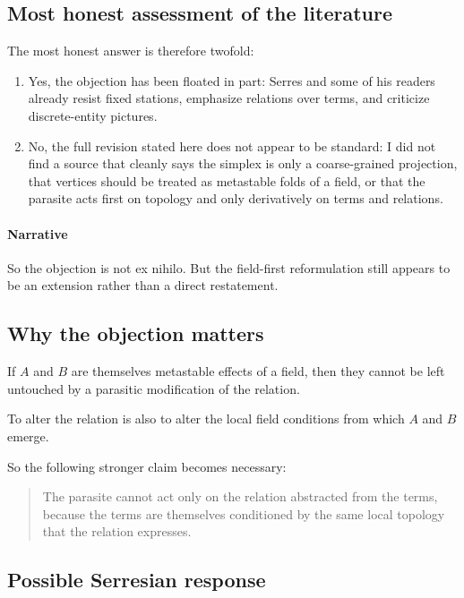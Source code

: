 \subsection*{Most honest assessment of the literature}

The most honest answer is therefore twofold:

\begin{enumerate}
\item Yes, the objection has been floated in part:
Serres and some of his readers already resist fixed stations, emphasize relations over terms,
and criticize discrete-entity pictures.

\item No, the full revision stated here does not appear to be standard:
I did not find a source that cleanly says the simplex is only a coarse-grained projection,
that vertices should be treated as metastable folds of a field, or that the parasite acts first
on topology and only derivatively on terms and relations.
\end{enumerate}

\paragraph{Narrative}
So the objection is not ex nihilo.
But the field-first reformulation still appears to be an extension rather than a direct restatement.

\subsection*{Why the objection matters}

If \(A\) and \(B\) are themselves metastable effects of a field, then they cannot be
left untouched by a parasitic modification of the relation.

To alter the relation is also to alter the local field conditions from which
\(A\) and \(B\) emerge.

So the following stronger claim becomes necessary:

\begin{quote}
The parasite cannot act only on the relation abstracted from the terms, because
the terms are themselves conditioned by the same local topology that the relation expresses.
\end{quote}

\subsection*{Possible Serresian response}

